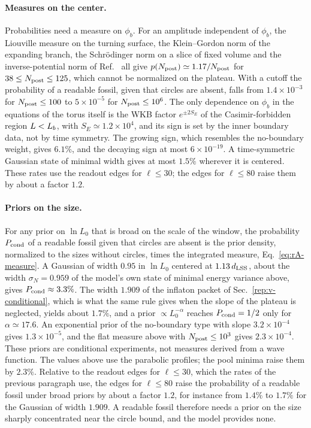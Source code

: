 \paragraph{Measures on the center.}
Probabilities need a measure on $\phi_b$.
For an amplitude independent of $\phi_b$, the Liouville measure on the turning surface, the Klein--Gordon norm of the expanding branch, the Schr\"odinger norm on a slice of fixed volume and the inverse-potential norm of Ref.~\cite{Godet:2026gqw} all give $p(N_{\rm post})\simeq1.17/N_{\rm post}$ for $38\leq N_{\rm post}\leq125$, which cannot be normalized on the plateau. %
With a cutoff the probability of a readable fossil, given that circles are absent, falls from $1.4\times10^{-3}$ for $N_{\rm post}\leq100$ to $5\times10^{-5}$ for $N_{\rm post}\leq10^6$. %
The only dependence on $\phi_b$ in the equations of the torus itself is the WKB factor $e^{\pm2S_E}$ of the Casimir-forbidden region $L<L_b$, with $S_E\simeq1.2\times10^4$, and its sign is set by the inner boundary data, not by time symmetry. %
The growing sign, which resembles the no-boundary weight, gives $6.1\%$, and the decaying sign at most $6\times10^{-19}$. %
A time-symmetric Gaussian state of minimal width gives at most $1.5\%$ wherever it is centered. %
These rates use the readout edges for $\ell\leq30$; the edges for $\ell\leq80$ raise them by about a factor $1.2$. %

\paragraph{Priors on the size.}
For any prior on $\ln L_0$ that is broad on the scale of the window, the probability $P_{\rm cond}$ of a readable fossil given that circles are absent is the prior density, normalized to the sizes without circles, times the integrated measure, Eq.~\eqref{eq:rA-measure}.
A Gaussian of width $0.95$ in $\ln L_0$ centered at $1.13\,d_{\mathrm{LSS}}$, about the width $\sigma_N=0.959$ of the model's own state of minimal energy variance above, gives $P_{\rm cond}\approx3.3\%$. %
The width $1.909$ of the inflaton packet of Sec.~\ref{rep:v-conditional}, which is what the same rule gives when the slope of the plateau is neglected, yields about $1.7\%$, and a prior $\propto L_0^{-\alpha}$ reaches $P_{\rm cond}=1/2$ only for $\alpha\simeq17.6$. %
An exponential prior of the no-boundary type with slope $3.2\times10^{-4}$ gives $1.3\times10^{-5}$, and the flat measure above with $N_{\rm post}\leq10^3$ gives $2.3\times10^{-4}$. %
These priors are conditional experiments, not measures derived from a wave function.
The values above use the parabolic profiles; the pool minima raise them by $2.3\%$. %
Relative to the readout edges for $\ell\leq30$, which the rates of the previous paragraph use, the edges for $\ell\leq80$ raise the probability of a readable fossil under broad priors by about a factor $1.2$, for instance from $1.4\%$ to $1.7\%$ for the Gaussian of width $1.909$. %
A readable fossil therefore needs a prior on the size sharply concentrated near the circle bound, and the model provides none.

